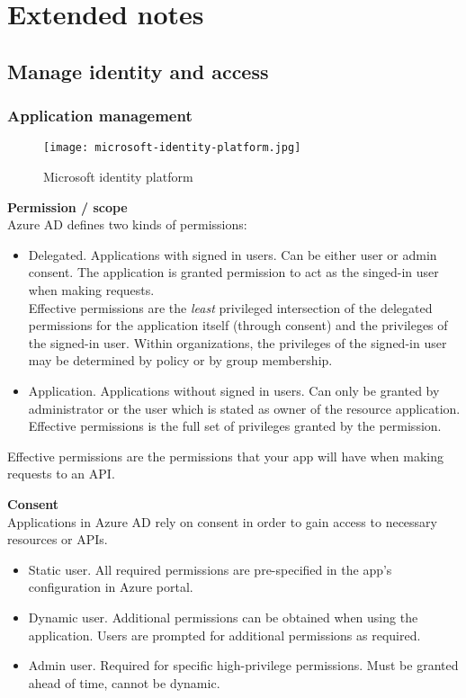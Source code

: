 \section{Extended notes}
\subsection{Manage identity and access}

\subsubsection{Application management}
\begin{figure}[!h]
\texttt{[image: microsoft-identity-platform.jpg]}
\caption{Microsoft identity platform}
\end{figure}

\textbf{Permission / scope} \\
Azure AD defines two kinds of permissions:
\begin{itemize}
\item Delegated. Applications with signed in users. Can be either user or admin consent. The application is granted permission to act as the singed-in user when making requests. \\ Effective permissions are the \textit{least} privileged intersection of the delegated permissions for the application itself (through consent) and the privileges of the signed-in user. Within organizations, the privileges of the signed-in user may be determined by policy or by group membership.
\item Application. Applications without signed in users. Can only be granted by administrator or the user which is stated as owner of the resource application. \\ Effective permissions is the full set of privileges granted by the permission.
\end{itemize}
Effective permissions are the permissions that your app will have when making requests to an API.

\textbf{Consent} \\
Applications in Azure AD rely on consent in order to gain access to necessary resources or APIs.
\begin{itemize}
\item Static user. All required permissions are pre-specified in the app's configuration in Azure portal.
\item Dynamic user. Additional permissions can be obtained when using the application. Users are prompted for additional permissions as required.
\item Admin user. Required for specific high-privilege permissions. Must be granted ahead of time, cannot be dynamic. 
\end{itemize}

